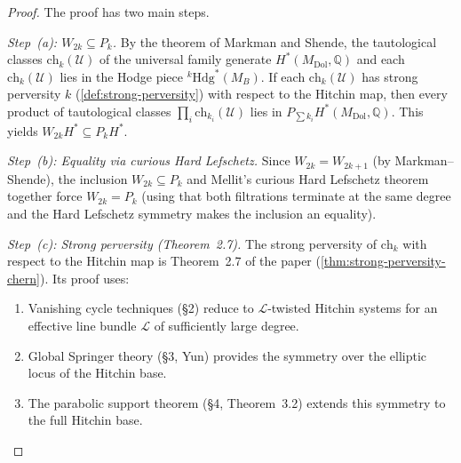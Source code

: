 \begin{proof}
  The proof has two main steps.

  \textit{Step~(a): \(W_{2k} \subseteq P_k\).}  By the theorem of Markman and Shende, the
  tautological classes $\mathrm{ch}_k(\mathcal{U})$ of the universal family generate
  $H^*(M_{\mathrm{Dol}}, \mathbb{Q})$ and each $\mathrm{ch}_k(\mathcal{U})$ lies in the
  Hodge piece ${}^k\mathrm{Hdg}^*(M_B)$.  If each $\mathrm{ch}_k(\mathcal{U})$ has strong
  perversity $k$ (\cref{def:strong-perversity}) with respect to the Hitchin map, then every
  product of tautological classes $\prod_i \mathrm{ch}_{k_i}(\mathcal{U})$ lies in
  $P_{\sum k_i} H^*(M_{\mathrm{Dol}}, \mathbb{Q})$.  This yields
  $W_{2k} H^* \subseteq P_k H^*$.

  \textit{Step~(b): Equality via curious Hard Lefschetz.}  Since $W_{2k} = W_{2k+1}$ (by
  Markman--Shende), the inclusion $W_{2k} \subseteq P_k$ and Mellit's curious Hard Lefschetz
  theorem together force $W_{2k} = P_k$ (using that both filtrations terminate at the same
  degree and the Hard Lefschetz symmetry makes the inclusion an equality).

  \textit{Step~(c): Strong perversity (Theorem~2.7).}  The strong perversity of
  $\mathrm{ch}_k$ with respect to the Hitchin map is Theorem~2.7 of the paper
  (\cref{thm:strong-perversity-chern}).  Its proof uses:
  \begin{enumerate}
    \item[(i)] Vanishing cycle techniques (§2) reduce to $\mathcal{L}$-twisted Hitchin systems
      for an effective line bundle $\mathcal{L}$ of sufficiently large degree.
    \item[(ii)] Global Springer theory (§3, Yun) provides the symmetry over the elliptic locus
      of the Hitchin base.
    \item[(iii)] The parabolic support theorem (§4, Theorem~3.2) extends this symmetry to the
      full Hitchin base.
  \end{enumerate}
\end{proof}

